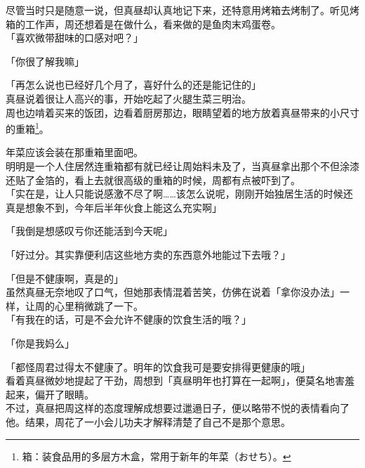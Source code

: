 尽管当时只是随意一说，但真昼却认真地记下来，还特意用烤箱去烤制了。听见烤箱的工作声，周还想着是在做什么，看来做的是鱼肉末鸡蛋卷。\\

「喜欢微带甜味的口感对吧？」

「你很了解我嘛」

「再怎么说也已经好几个月了，喜好什么的还是能记住的」\\

真昼说着很让人高兴的事，开始吃起了火腿生菜三明治。\\

周也边啃着买来的饭团，边看着厨房那边，眼睛望着的地方放着真昼带来的小尺寸的重箱\footnote{箱：装食品用的多层方木盒，常用于新年的年菜（{\jpfont おせち}）。}。

年菜应该会装在那重箱里面吧。\\

明明是一个人住居然连重箱都有就已经让周始料未及了，当真昼拿出那个不但涂漆还贴了金箔的，看上去就很高级的重箱的时候，周都有点被吓到了。\\

「实在是，让人只能说感激不尽了啊……该怎么说呢，刚刚开始独居生活的时候还真是想象不到，今年后半年伙食上能这么充实啊」

「我倒是想感叹亏你还能活到今天呢」

「好过分。其实靠便利店这些地方卖的东西意外地能过下去哦？」

「但是不健康啊，真是的」\\

虽然真昼无奈地叹了口气，但她那表情混着苦笑，仿佛在说着「拿你没办法」一样，让周的心里稍微跳了一下。\\

「有我在的话，可是不会允许不健康的饮食生活的哦？」

「你是我妈么」

「都怪周君过得太不健康了。明年的饮食我可是要安排得更健康的哦」\\

看着真昼微妙地提起了干劲，周想到「真昼明年也打算在一起啊」，便莫名地害羞起来，偏开了眼睛。\\

不过，真昼把周这样的态度理解成想要过邋遢日子，便以略带不悦的表情看向了他。结果，周花了一小会儿功夫才解释清楚了自己不是那个意思。
